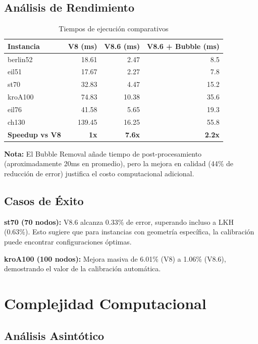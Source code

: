 \documentclass[12pt, a4paper]{article}
\begin{document}
\subsection{Análisis de Rendimiento}

\begin{table}[h]
\centering
\begin{tabular}{lrrr}
\toprule
\textbf{Instancia} & \textbf{V8 (ms)} & \textbf{V8.6 (ms)} & \textbf{V8.6 + Bubble (ms)} \\
\midrule
berlin52 & 18.61 & 2.47 & 8.5 \\
eil51 & 17.67 & 2.27 & 7.8 \\
st70 & 32.83 & 4.47 & 15.2 \\
kroA100 & 74.83 & 10.38 & 35.6 \\
eil76 & 41.58 & 5.65 & 19.3 \\
ch130 & 139.45 & 16.25 & 55.8 \\
\midrule
\textbf{Speedup vs V8} & \textbf{1x} & \textbf{7.6x} & \textbf{2.2x} \\
\bottomrule
\end{tabular}
\caption{Tiempos de ejecución comparativos}
\label{tab:times}
\end{table}

\textbf{Nota:} El Bubble Removal añade tiempo de post-procesamiento (aproximadamente 20ms en promedio), pero la mejora en calidad (44\% de reducción de error) justifica el costo computacional adicional.

\subsection{Casos de Éxito}

\textbf{st70 (70 nodos):} V8.6 alcanza 0.33\% de error, superando incluso a LKH (0.63\%). Esto sugiere que para instancias con geometría específica, la calibración puede encontrar configuraciones óptimas.

\textbf{kroA100 (100 nodos):} Mejora masiva de 6.01\% (V8) a 1.06\% (V8.6), demostrando el valor de la calibración automática.

\section{Complejidad Computacional}

\subsection{Análisis Asintótico}
\end{document}
